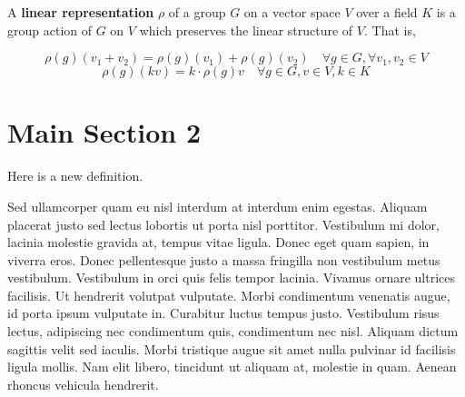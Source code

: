 \begin{defn}A \textbf{linear representation} $\rho$ of a group $G$ on a vector space $V$ over a field $K$ is a group action of $G$ on $V$ which preserves the linear structure of $V$.  That is, 


\begin{equation} \rho(g)(v_1+v_2)=\rho(g)(v_1)+\rho(g)(v_2) \quad  \forall g \in G, \forall v_1, v_2 \in V \end{equation}
 \[\rho(g)(kv) = k \cdot \rho(g)v \quad \forall g \in G, v \in V, k \in K \]

 \end{defn}

\section{Main Section 2}


\begin{defn}Here is a new definition.\end{defn}

Sed ullamcorper quam eu nisl interdum at interdum enim egestas. Aliquam placerat justo sed lectus lobortis ut porta nisl porttitor. Vestibulum mi dolor, lacinia molestie gravida at, tempus vitae ligula. Donec eget quam sapien, in viverra eros. Donec pellentesque justo a massa fringilla non vestibulum metus vestibulum. Vestibulum in orci quis felis tempor lacinia. Vivamus ornare ultrices facilisis. Ut hendrerit volutpat vulputate. Morbi condimentum venenatis augue, id porta ipsum vulputate in. Curabitur luctus tempus justo. Vestibulum risus lectus, adipiscing nec condimentum quis, condimentum nec nisl. Aliquam dictum sagittis velit sed iaculis. Morbi tristique augue sit amet nulla pulvinar id facilisis ligula mollis. Nam elit libero, tincidunt ut aliquam at, molestie in quam. Aenean rhoncus vehicula hendrerit.